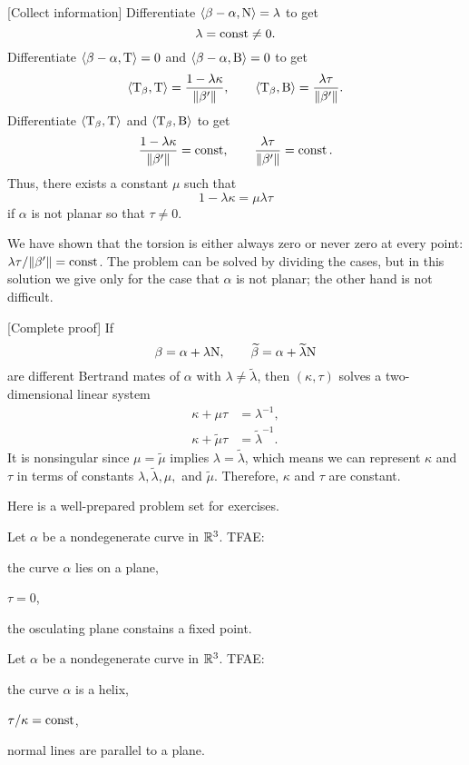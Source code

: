 \documentclass{../note}
\def\a{\alpha}
\begin{document}
\begin{prb}
\begin{sol}
[Collect information]
Differentiate $\<\beta-\a,\rN\>=\lambda$ to get
\[\lambda=\operatorname{const}\ne0.\]
Differentiate $\<\beta-\a,\rT\>=0$ and $\<\beta-\a,\rB\>=0$ to get
\[\langle\mathrm{T}_\beta,\mathrm{T}\rangle=\frac{1-\lambda\kappa}{\|\beta'\|},\qquad\langle\mathrm{T}_\beta,\mathrm{B}\rangle=\frac{\lambda\tau}{\|\beta'\|}.\]
Differentiate $\langle\mathrm{T}_\beta,\mathrm{T}\rangle$ and $\langle\mathrm{T}_\beta,\mathrm{B}\rangle$ to get
\[\frac{1-\lambda\kappa}{\|\beta'\|}=\operatorname{const},\qquad\frac{\lambda\tau}{\|\beta'\|}=\operatorname{const}.\]
Thus, there exists a constant $\mu$ such that
\[1-\lambda\kappa=\mu\lambda\tau\]
if $\a$ is not planar so that $\tau\ne0$.

We have shown that the torsion is either always zero or never zero at every point: $\lambda\tau/\|\beta'\|=\operatorname{const}$.
The problem can be solved by dividing the cases, but in this solution we give only for the case that $\a$ is not planar; the other hand is not difficult.

[Complete proof]
If
\[\beta=\a+\lambda\rN,\qquad\tilde\beta=\a+\tilde\lambda\rN\]
are different Bertrand mates of $\a$ with $\lambda\ne\tilde\lambda$, then $(\kappa,\tau)$ solves a two-dimensional linear system
\begin{align*}
\kappa+\mu\tau&=\lambda^{-1},\\
\kappa+\tilde\mu\tau&=\tilde\lambda^{-1}.
\end{align*}
It is nonsingular since $\mu=\tilde\mu$ implies $\lambda=\tilde\lambda$, which means we can represent $\kappa$ and $\tau$ in terms of constants $\lambda,\tilde\lambda,\mu,$ and $\tilde\mu$.
Therefore, $\kappa$ and $\tau$ are constant.
\end{sol}

Here is a well-prepared problem set for exercises.

\begin{prb}
Let $\a$ be a nondegenerate curve in $\mathbb{R}^3$.
TFAE:
\begin{parts}
\item the curve $\a$ lies on a plane,
\item $\tau=0$,
\item the osculating plane constains a fixed point.
\end{parts}
\end{prb}

\begin{prb}[Helices]
Let $\a$ be a nondegenerate curve in $\mathbb{R}^3$.
TFAE:
\begin{parts}
\item the curve $\a$ is a helix,
\item $\tau/\kappa=\operatorname{const}$,
\item normal lines are parallel to a plane.
\end{parts}
\end{prb}


\end{prb}
\end{document}
